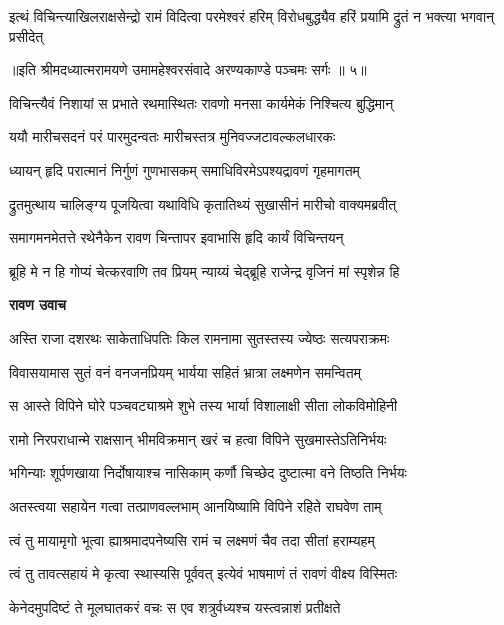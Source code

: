 \fourlineindentedshloka
{इत्थं विचिन्त्याखिलराक्षसेन्द्रो}
{रामं विदित्वा परमेश्वरं हरिम्}
{विरोधबुद्ध्यैव हरिं प्रयामि}
{द्रुतं न भक्त्या भगवान् प्रसीदेत्} %

{॥इति श्रीमदध्यात्मरामयणे उमामहेश्वरसंवादे
अरण्यकाण्डे पञ्चमः सर्गः ॥ ५॥
}




\twolineshloka
{विचिन्त्यैवं निशायां स प्रभाते रथमास्थितः}
{रावणो मनसा कार्यमेकं निश्चित्य बुद्धिमान्} %

\twolineshloka
{ययौ मारीचसदनं परं पारमुदन्वतः}
{मारीचस्तत्र मुनिवज्जटावल्कलधारकः} %

\twolineshloka
{ध्यायन् हृदि परात्मानं निर्गुणं गुणभासकम्}
{समाधिविरमेऽपश्यद्रावणं गृहमागतम्} %

\twolineshloka
{द्रुतमुत्थाय चालिङ्ग्य पूजयित्वा यथाविधि}
{कृतातिथ्यं सुखासीनं मारीचो वाक्यमब्रवीत्} %

\twolineshloka
{समागमनमेतत्ते रथेनैकेन रावण}
{चिन्तापर इवाभासि हृदि कार्यं विचिन्तयन्} %

\twolineshloka
{ब्रूहि मे न हि गोप्यं चेत्करवाणि तव प्रियम्}
{न्याय्यं चेद्ब्रूहि राजेन्द्र वृजिनं मां स्पृशेन्न हि} %

\textbf{रावण उवाच}

\twolineshloka
{अस्ति राजा दशरथः साकेताधिपतिः किल}
{रामनामा सुतस्तस्य ज्येष्ठः सत्यपराक्रमः} %

\twolineshloka
{विवासयामास सुतं वनं वनजनप्रियम्}
{भार्यया सहितं भ्रात्रा लक्ष्मणेन समन्वितम्} %

\twolineshloka
{स आस्ते विपिने घोरे पञ्चवट्याश्रमे शुभे}
{तस्य भार्या विशालाक्षी सीता लोकविमोहिनी} %

\twolineshloka
{रामो निरपराधान्मे राक्षसान् भीमविक्रमान्}
{खरं च हत्वा विपिने सुखमास्तेऽतिनिर्भयः} %

\twolineshloka
{भगिन्याः शूर्पणखाया निर्दोषायाश्च नासिकाम्}
{कर्णौ चिच्छेद दुष्टात्मा वने तिष्ठति निर्भयः} %

\twolineshloka
{अतस्त्वया सहायेन गत्वा तत्प्राणवल्लभाम्}
{आनयिष्यामि विपिने रहिते राघवेण ताम्} %

\twolineshloka
{त्वं तु मायामृगो भूत्वा ह्याश्रमादपनेष्यसि}
{रामं च लक्ष्मणं चैव तदा सीतां हराम्यहम्} %

\twolineshloka
{त्वं तु तावत्सहायं मे कृत्वा स्थास्यसि पूर्ववत्}
{इत्येवं भाषमाणं तं रावणं वीक्ष्य विस्मितः} %

\twolineshloka
{केनेदमुपदिष्टं ते मूलघातकरं वचः}
{स एव शत्रुर्वध्यश्च यस्त्वन्नाशं प्रतीक्षते} %

